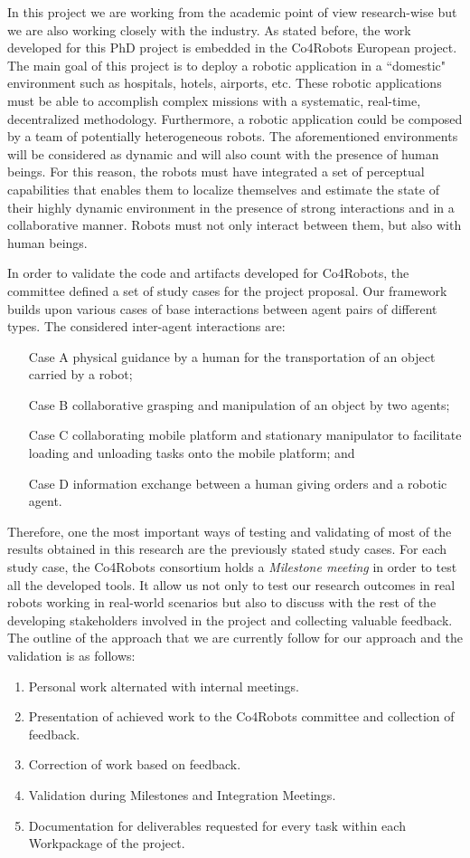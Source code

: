 In this project we are working from the academic point of view research-wise but we are also working closely with the industry.
As stated before, the work developed for this PhD project is embedded in the Co4Robots European project.
The main goal of this project is to deploy a robotic application in a ``domestic" environment such as hospitals, hotels, airports, etc.
These robotic applications must be able to accomplish complex missions with a systematic, real-time, decentralized methodology.
Furthermore, a robotic application could be composed by a team of potentially heterogeneous robots.
The aforementioned environments will be considered as dynamic and will also count with the presence of human beings.
For this reason, the robots must have integrated a set of perceptual capabilities that enables them to localize themselves and estimate the state of their highly dynamic environment in the presence of strong interactions and in a collaborative manner.
Robots must not only interact between them, but also with human beings.

In order to validate the code and artifacts developed for Co4Robots, the committee defined a set of study cases for the project proposal.
Our framework builds upon various cases of base interactions between agent pairs of different types. 
The considered inter-agent interactions are:
\begin{itemize}
\item[Case A] physical guidance by a human for the transportation of an object carried by a robot;
\item[Case B] collaborative grasping and manipulation of an object by two agents;
\item[Case C]collaborating mobile platform and stationary manipulator to facilitate loading and unloading tasks onto the mobile platform; and
\item[Case D] information exchange between a human giving orders and a robotic agent. 
\end{itemize}

Therefore, one the most important ways of testing and validating of most of the results obtained in this research are the previously stated study cases.
For each study case, the Co4Robots consortium holds a \emph{Milestone meeting} in order to test all the developed tools.
It allow us not only to test our research outcomes in real robots working in real-world scenarios but also to discuss with the rest of the developing stakeholders involved in the project and collecting valuable feedback.
The outline of the approach that we are currently follow for our approach and the validation is as follows:
\begin{enumerate}
\item Personal work alternated with internal meetings.
\item Presentation of achieved work to the Co4Robots committee and collection of feedback.
\item Correction of work based on feedback.
\item Validation during Milestones and Integration Meetings.
\item Documentation for deliverables requested for every task within each Workpackage of the project.
\end{enumerate}

